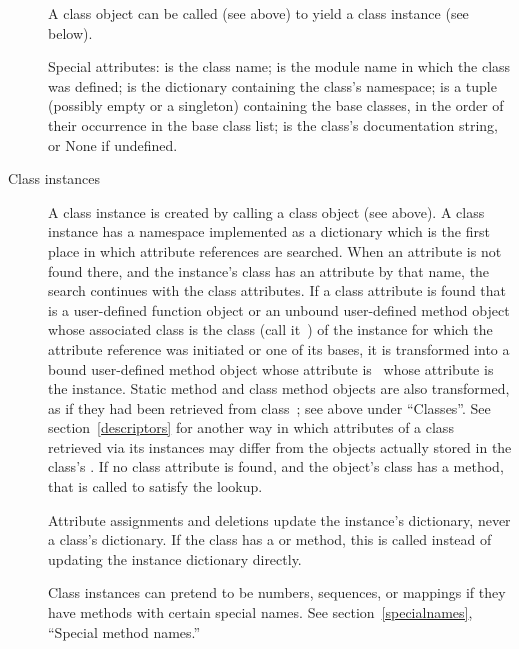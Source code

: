 \begin{description}
A class object can be called (see above) to yield a class instance (see
below).

Special attributes:  is the class name;
 is the module name in which the class was defined;
 is the dictionary containing the class's namespace;
 is a tuple (possibly empty or a singleton)
containing the base classes, in the order of their occurrence in the
base class list;  is the class's documentation string,
or None if undefined.

\item[Class instances]
A class instance is created by calling a class object (see above).
A class instance has a namespace implemented as a dictionary which
is the first place in which
attribute references are searched.  When an attribute is not found
there, and the instance's class has an attribute by that name,
the search continues with the class attributes.  If a class attribute
is found that is a user-defined function object or an unbound
user-defined method object whose associated class is the class
(call it~) of the instance for which the attribute reference
was initiated or one of its bases,
it is transformed into a bound user-defined method object whose
 attribute is~ whose  attribute
is the instance. Static method and class method objects are also
transformed, as if they had been retrieved from class~;
see above under ``Classes''. See section~\ref{descriptors} for
another way in which attributes of a class retrieved via its
instances may differ from the objects actually stored in the
class's .
If no class attribute is found, and the object's class has a
 method, that is called to satisfy the lookup.

Attribute assignments and deletions update the instance's dictionary,
never a class's dictionary.  If the class has a  or
 method, this is called instead of updating the
instance dictionary directly.

Class instances can pretend to be numbers, sequences, or mappings if
they have methods with certain special names.  See
section~\ref{specialnames}, ``Special method names.''


\end{description}
